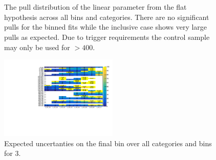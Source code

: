 \begin{figure}[h!]
  \centering
  ~~
  \\
  ~~
  \\
  \caption{\label{fig:frenchFlagPulls13} The pull distribution of the linear parameter from the flat hypothesis across all
  \scalht bins and categories. There are no significant pulls for the \scalht binned
  fits while the \scalht inclusive case shows very large pulls as expected. 
  Due to trigger requirements the \gj control sample may only be used for \scalht $> 400$\GeV.}
\end{figure}
\begin{figure}[]
  \centering
  \includegraphics[width=0.5\textwidth]{figures/template/frenchFlagLastBin.pdf}
  \caption{\label{fig:frenchFlagLastBin} Expected uncertanties on the final bin
over all categories and \scalht bins for 3\ifb.}
\end{figure}
